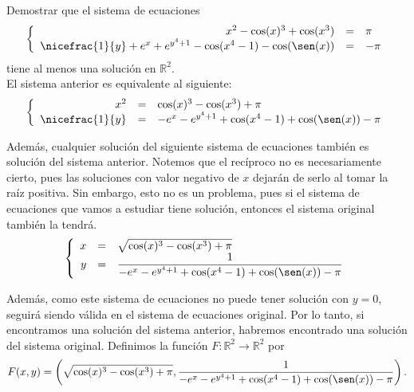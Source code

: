 \documentclass[12pt]{article}
\begin{document}
    \begin{ejercicio}[2 puntos]
        Demostrar que el sistema de ecuaciones
        \begin{equation*}
            \left\{\begin{array}{rcl}
                    x^2-\cos(x)^3 + \cos(x^3) & = & \pi \\
                    \nicefrac{1}{y}+e^x + e^{y^4+1}-\cos(x^4-1)-\cos(\sen(x)) &=&-\pi
            \end{array}\right.
        \end{equation*}
        tiene al menos una solución en $\mathbb{R}^2$.\\

        El sistema anterior es equivalente al siguiente:
        \begin{equation*}
            \left\{\begin{array}{rcl}
                    x^2&=&\cos(x)^3 - \cos(x^3) + \pi \\
                    \nicefrac{1}{y}&=& -e^x - e^{y^4+1}+\cos(x^4-1)+\cos(\sen(x)) -\pi
            \end{array}\right.
        \end{equation*}

        Además, cualquier solución del siguiente sistema de ecuaciones también es solución del sistema anterior. Notemos que el recíproco no es necesariamente cierto, pues las soluciones con valor negativo de $x$ dejarán de serlo al tomar la raíz positiva. Sin embargo, esto no es un problema, pues si el sistema de ecuaciones que vamos a estudiar tiene solución, entonces el sistema original también la tendrá.
        \begin{equation*}
            \left\{\begin{array}{rcl}
                    x&=&\sqrt{\cos(x)^3 - \cos(x^3) + \pi} \\
                    y&=& \dfrac{1}{-e^x - e^{y^4+1}+\cos(x^4-1)+\cos(\sen(x)) -\pi}
            \end{array}\right.
        \end{equation*}

        Además, como este sistema de ecuaciones no puede tener solución con $y=0$, seguirá siendo válida en el sistema de ecuaciones original. Por lo tanto, si encontramos una solución del sistema anterior, habremos encontrado una solución del sistema original. Definimos la función $F:\mathbb{R}^2\to \mathbb{R}^2$ por
        \begin{equation*}
            F(x,y) = \left(\sqrt{\cos(x)^3 - \cos(x^3) + \pi}, \dfrac{1}{-e^x - e^{y^4+1}+\cos(x^4-1)+\cos(\sen(x)) -\pi}\right).
        \end{equation*}


\end{ejercicio}
\end{document}
